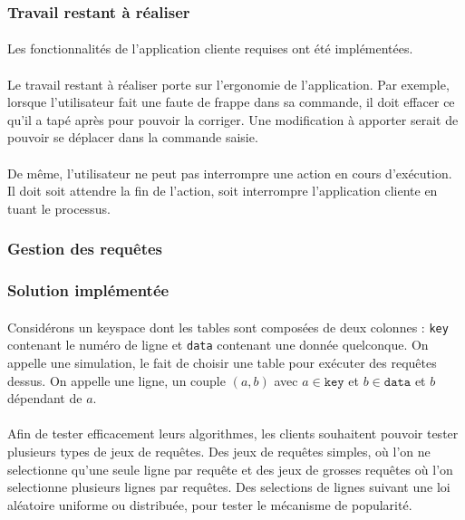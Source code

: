 \documentclass[12pt]{article}
\begin{document}
\subsubsection*{Travail restant à réaliser}

\paragraph{} Les fonctionnalités de l'application cliente requises ont été implémentées.

\paragraph{} Le travail restant à réaliser porte sur l'ergonomie de l'application. 
Par exemple, lorsque l'utilisateur fait une faute de frappe dans sa commande, il doit effacer ce qu'il a tapé après pour pouvoir la corriger.
Une modification à apporter serait de pouvoir se déplacer dans la commande saisie.

\paragraph{} De même, l'utilisateur ne peut pas interrompre une action en cours d'exécution. Il doit soit attendre la fin de l'action, soit interrompre l'application cliente en tuant le processus.

\subsubsection{Gestion des requêtes}

\subsubsection*{Solution implémentée}

\paragraph{} Considérons un keyspace dont les tables sont composées de deux colonnes : \texttt{key} contenant le numéro de ligne et \texttt{data} contenant une donnée quelconque.
On appelle une simulation, le fait de choisir une table pour exécuter des requêtes dessus. On appelle une ligne, un couple $(a,b)$ avec $a \in \texttt{key}$ et $b \in \texttt{data}$ et $b$ dépendant de $a$.

\paragraph{}Afin de tester efficacement leurs algorithmes, les clients souhaitent pouvoir tester plusieurs types de jeux de requêtes. 
Des jeux de requêtes simples, où l'on ne selectionne qu'une seule ligne par requête et des jeux de grosses requêtes où l'on selectionne plusieurs lignes par requêtes.
Des selections de lignes suivant une loi aléatoire uniforme ou distribuée, pour tester le mécanisme de popularité.
\end{document}
